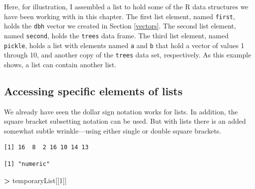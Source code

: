 \documentclass[]{krantz}
\makeatletter
\newenvironment{Shaded}{\begin{snugshade}}{\end{snugshade}}
\newcommand{\KeywordTok}[1]{\textcolor[rgb]{0.27,0.27,0.27}{\textbf{#1}}}
\newcommand{\DecValTok}[1]{\textcolor[rgb]{0.06,0.06,0.06}{#1}}
\newcommand{\StringTok}[1]{\textcolor[rgb]{0.5,0.5,0.5}{#1}}
\newcommand{\OperatorTok}[1]{\textcolor[rgb]{0.43,0.43,0.43}{\textbf{#1}}}
\newcommand{\NormalTok}[1]{#1}
\newenvironment{kframe}{%
\medskip{}
\setlength{\fboxsep}{.8em}
 \def\at@end@of@kframe{}%
 \ifinner\ifhmode%
  \def\at@end@of@kframe{\end{minipage}}%
  \begin{minipage}{\columnwidth}%
 \fi\fi%
 \def\FrameCommand##1{\hskip\@totalleftmargin \hskip-\fboxsep
 \colorbox{shadecolor}{##1}\hskip-\fboxsep
     \hskip-\linewidth \hskip-\@totalleftmargin \hskip\columnwidth}%
 \MakeFramed {\advance\hsize-\width
   \@totalleftmargin\z@ \linewidth\hsize
   \@setminipage}}%
 {\par\unskip\endMakeFramed%
 \at@end@of@kframe}
\renewenvironment{Shaded}{\begin{kframe}}{\end{kframe}}
\theoremstyle{definition}
\theoremstyle{definition}
\theoremstyle{definition}
\theoremstyle{remark}
\makeatother
\begin{document}
Here, for illustration, I assembled a list to hold some of the R data
structures we have been working with in this chapter. The first list
element, named \texttt{first}, holds the \texttt{dbh} vector we created
in Section \ref{vectors}. The second list element, named
\texttt{second}, holds the \texttt{trees} data frame. The third list
element, named \texttt{pickle}, holds a list with elements named
\texttt{a} and \texttt{b} that hold a vector of values 1 through 10, and
another copy of the \texttt{trees} data set, respectively. As this
example shows, a list can contain another list.

\subsection{Accessing specific elements of
lists}\label{accessing-specific-elements-of-lists}

We already have seen the dollar sign notation works for lists. In
addition, the square bracket subsetting notation can be used. But with
lists there is an added somewhat subtle wrinkle---using either single or
double square brackets.

\begin{Shaded}
\end{Shaded}

\begin{verbatim}
[1] 16  8  2 16 10 14 13
\end{verbatim}

\begin{Shaded}
\end{Shaded}

\begin{verbatim}
[1] "numeric"
\end{verbatim}

\begin{Shaded}
\begin{Highlighting}[]
\OperatorTok{>}\StringTok{ }\NormalTok{temporaryList[[}\DecValTok{1}\NormalTok{]]}
\end{Highlighting}
\end{Shaded}
\end{document}
